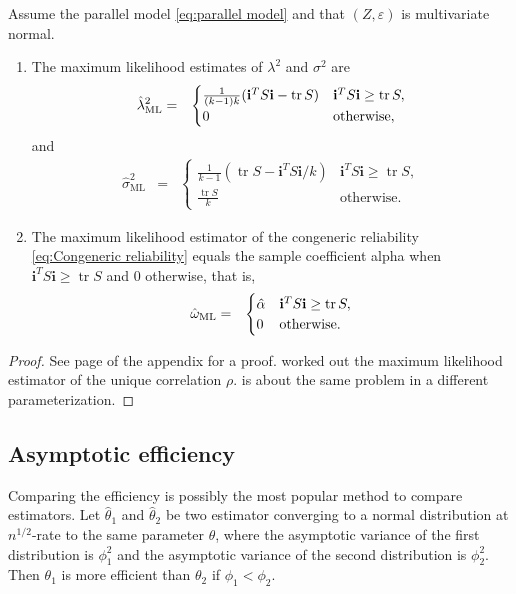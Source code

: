 \documentclass[twoside]{article}
\DeclareMathOperator{\tr}{tr}
\begin{document}
\begin{thm}\label{thm:ML}
Assume the parallel model \eqref{eq:parallel model} and that $(Z,\varepsilon)$ is multivariate normal. 
\begin{enumerate}[label=(\roman*)]
\item The maximum likelihood estimates of $\lambda^{2}$
and $\sigma^{2}$ are 
\begin{eqnarray*}
\hat{\lambda}^2_\textrm{ML} & = & \begin{cases}
\frac{1}{(k-1)k}(\mathbf{i}^{T}S\mathbf{i}-\tr{S}) & \mathbf{i}^{T}S\mathbf{i}\geq\tr{S},\\
0 & \text{\textrm{otherwise}},
\end{cases}\\
\end{eqnarray*}
and
\begin{eqnarray*}
\hat{\sigma}^2_\textrm{ML} & = & \begin{cases}
\frac{1}{k-1}(\tr{S}-\mathbf{i}^{T}S\mathbf{i}/k) & \mathbf{i}^{T}S\mathbf{i}\geq\tr{S},\\
\frac{\tr{S}}{k} & \textrm{otherwise}.
\end{cases}
\end{eqnarray*}
\item The maximum likelihood estimator of the congeneric reliability
\eqref{eq:Congeneric reliability} equals the sample coefficient alpha
when $\mathbf{i}^{T}S\mathbf{i}\geq\tr{S}$ and $0$ otherwise, that is,
\begin{eqnarray*}
\hat{\omega}_\textrm{ML} & = & \begin{cases}
\hat{\alpha} & \mathbf{i}^{T}S\mathbf{i}\geq\tr{S},\\
0 & \text{\textrm{otherwise}}.
\end{cases}
\end{eqnarray*}
\end{enumerate}
\end{thm}
\begin{proof}
See page \pageref{proof:ML} of the appendix for a proof. \citet[][section B]{Kristof1963-tb} worked out the maximum likelihood estimator of the unique correlation $\rho$. \citep[][Exercise 3.9, p. 114]{Muirhead2009-kq} is about the same problem in a different parameterization.
\end{proof}

\subsection{Asymptotic efficiency}
Comparing the efficiency is possibly the most popular method to compare estimators. Let $\hat{\theta}_1$ and $\hat{\theta}_2$ be two estimator converging to a normal distribution at $n^{1/2}$-rate to the same parameter $\theta$,  where the asymptotic variance of the first distribution is $\phi_1^2$ and the asymptotic variance of the second distribution is $\phi_2^2$. Then $\theta_1$ is more efficient than $\theta_2$ if $\phi_1<\phi_2$. 
\end{document}
